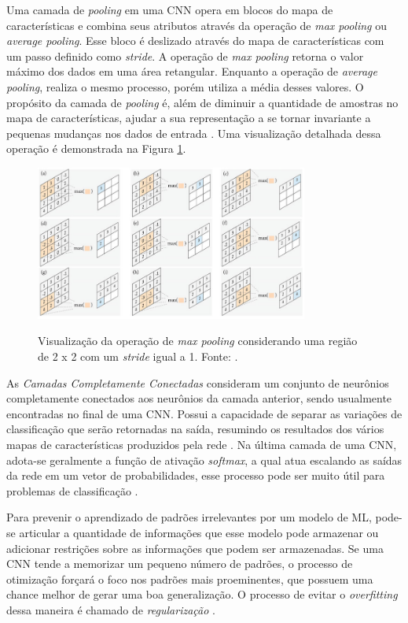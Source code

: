 Uma camada de \emph{pooling} em uma CNN opera em blocos do mapa de características e combina seus atributos através da operação de \emph{max pooling} ou \emph{average pooling}. Esse bloco é deslizado através do mapa de características com um passo definido como \emph{stride}. A operação de \emph{max pooling} retorna o valor máximo dos dados em uma área retangular. Enquanto a operação de \emph{average pooling}, realiza o mesmo processo, porém utiliza a média desses valores. O propósito da camada de \emph{pooling} é, além de diminuir a quantidade de amostras no mapa de características, ajudar a sua representação a se tornar invariante a pequenas mudanças nos dados de entrada \cite{khan, goodfellow}. Uma visualização detalhada dessa operação é demonstrada na Figura \ref{fig:pooling}.

\begin{figure}[h!]
  \centering
  \caption{Visualização da operação de \emph{max pooling} considerando uma região de 2 x 2 com um \emph{stride} igual a 1. Fonte: \cite{khan}.}
  \includegraphics[width=0.8\textwidth]{imgs/pooling}
  \label{fig:pooling}
\end{figure}


As \emph{Camadas Completamente Conectadas} consideram um conjunto de neurônios completamente conectados aos neurônios da camada anterior, sendo usualmente encontradas no final de uma CNN. Possui a capacidade de separar as variações de classificação que serão retornadas na saída, resumindo os resultados dos vários mapas de características produzidos pela rede \cite{khan}. Na última camada de uma CNN, adota-se geralmente a função de ativação \emph{softmax}, a qual atua escalando as saídas da rede em um vetor de probabilidades, esse processo pode ser muito útil para problemas de classificação \cite{gulli}.

Para prevenir o aprendizado de padrões irrelevantes por um modelo de ML, pode-se articular a quantidade de informações que esse modelo pode armazenar ou adicionar restrições sobre as informações que podem ser armazenadas. Se uma CNN tende a memorizar um pequeno número de padrões, o processo de otimização forçará o foco nos padrões mais proeminentes, que possuem uma chance melhor de gerar uma boa generalização. O processo de evitar o \emph{overfitting} dessa maneira é chamado de \emph{regularização} \cite{chollet}.

